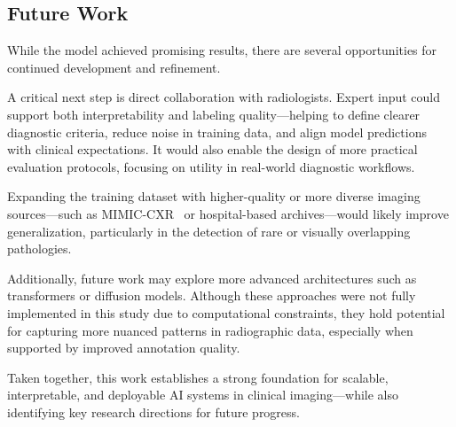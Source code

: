 \documentclass[12pt]{article}
\begin{document}
\begin{multicols}{2}
\subsection{Future Work}
While the model achieved promising results, there are several opportunities for continued development and refinement.

A critical next step is direct collaboration with radiologists. Expert input could support both interpretability and labeling quality—helping to define clearer diagnostic criteria, reduce noise in training data, and align model predictions with clinical expectations. It would also enable the design of more practical evaluation protocols, focusing on utility in real-world diagnostic workflows.

Expanding the training dataset with higher-quality or more diverse imaging sources—such as MIMIC-CXR~\cite{johnson2019mimic} or hospital-based archives—would likely improve generalization, particularly in the detection of rare or visually overlapping pathologies.

Additionally, future work may explore more advanced architectures such as transformers or diffusion models. Although these approaches were not fully implemented in this study due to computational constraints, they hold potential for capturing more nuanced patterns in radiographic data, especially when supported by improved annotation quality.

Taken together, this work establishes a strong foundation for scalable, interpretable, and deployable AI systems in clinical imaging—while also identifying key research directions for future progress.


\end{multicols}

\vspace{200pt}

\pagebreak
\end{document}
